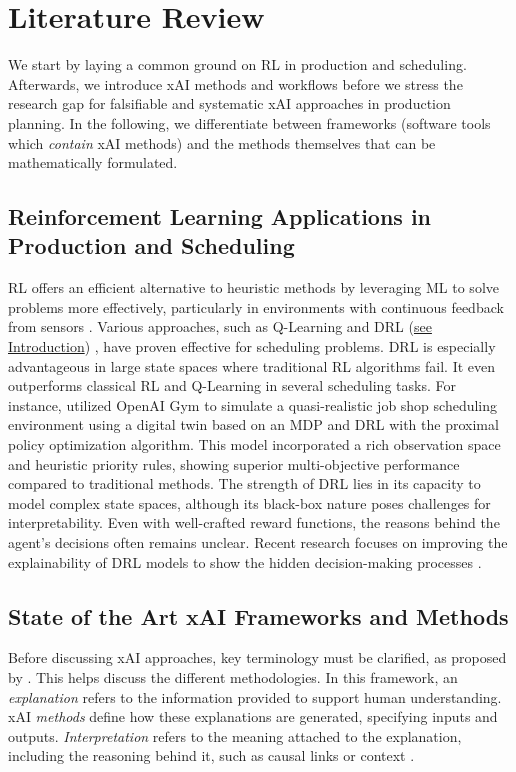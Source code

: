 \section{Literature Review}
\label{literature}
We start by laying a common ground on RL in production and scheduling. Afterwards, we introduce xAI methods and workflows before we stress the research gap for falsifiable and systematic xAI approaches in production planning. In the following, we differentiate between frameworks (software tools which \textit{contain} xAI methods) and the methods themselves that can be mathematically formulated.

\subsection{Reinforcement Learning Applications in Production and Scheduling}
RL offers an efficient alternative to heuristic methods by leveraging ML to solve problems more effectively, particularly in environments with continuous feedback from sensors . Various approaches, such as Q-Learning  and DRL (\hyperlink{RL}{see Introduction}) , have proven effective for scheduling problems. DRL is especially advantageous in large state spaces where traditional RL algorithms fail. It even outperforms classical RL and Q-Learning in several scheduling tasks. For instance,  utilized OpenAI Gym to simulate a quasi-realistic job shop scheduling environment using a digital twin based on an MDP and DRL with the proximal policy optimization algorithm. This model incorporated a rich observation space and heuristic priority rules, showing superior multi-objective performance compared to traditional methods. The strength of DRL lies in its capacity to model complex state spaces, although its black-box nature poses challenges for interpretability. Even with well-crafted reward functions, the reasons behind the agent's decisions often remains unclear. Recent research focuses on improving the explainability of DRL models to show the hidden decision-making processes .

\subsection{State of the Art xAI Frameworks and Methods}
Before discussing xAI approaches, key terminology must be clarified, as proposed by . This helps discuss the different methodologies.
In this framework, an \textit{explanation} refers to the information provided to support human understanding. xAI \textit{methods} define how these explanations are generated, specifying inputs and outputs. \textit{Interpretation} refers to the meaning attached to the explanation, including the reasoning behind it, such as causal links or context .

